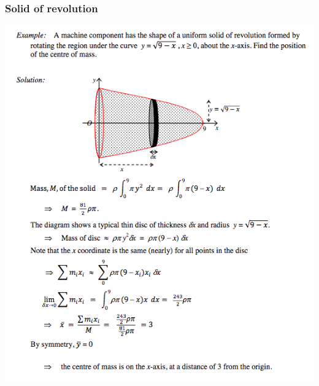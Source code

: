 \documentclass[a4paper]{article}
\begin{document}
\subsubsection{Solid of revolution}
\begin{center}
    \includegraphics[scale=0.5]{img_M/14_eg1}
\end{center}
\end{document}
